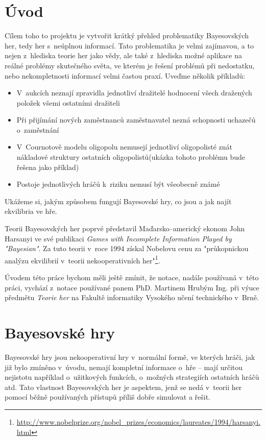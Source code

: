 \documentclass[12pt,a4paper,titlepage,final]{article}
\begin{document}
\section {Úvod} \label{uvod}
Cílem toho to projektu je vytvořit krátký přehled problematiky Bayesovských her, tedy her s~neúplnou informací.
Tato problematika je velmi zajímavou, a to nejen z~hlediska teorie her jako vědy, ale také z~hlediska možné aplikace na reálné problémy skutečného světa, ve kterém je řešení problémů při nedostatku, nebo nekompletnosti informací velmi častou praxí.
Uveďme několik příkladů:
\begin{itemize}
 \item V~aukcích neznají zpravidla jednotliví dražitelé hodnocení všech dražených položek všemi ostatními dražiteli
 \item Při přijímání nových zaměstnanců zaměstnavatel nezná schopnosti uchazečů o~zaměstnání
 \item V~Cournotově modelu oligopolu nemusejí jednotliví oligopolisté znát nákladové struktury ostatních oligopolistů(ukázka tohoto problému bude řešena jako příklad)
 \item Postoje jednotlivých hráčů k~riziku nemusí být všeobecně známé
\end{itemize}
Ukážeme si, jakým způsobem fungují Bayesovské hry, co jsou a jak najít ekvilibria ve hře.

Teorii Bayesovských her poprvé představil Maďarsko--americký ekonom John Harsanyi ve své publikaci \textit{Games with Incomplete Information Played by "Bayesian"}\cite{Harsanyi2004}.
Za tuto teorii v~roce 1994 získal Nobelovu cenu za "průkopnickou analýzu ekvilibrií v~teorii nekooperativních her"\footnote{\url{http://www.nobelprize.org/nobel_prizes/economics/laureates/1994/harsanyi.html}}.

Úvodem této práce bychom měli ještě zmínit, že notace, nadále používaná v~této práci, vychází z~notace používané panem PhD. Martinem Hrubým Ing. při výuce předmětu \textit{Teorie her} na Fakultě informatiky Vysokého učení technického v~Brně.

\section{Bayesovské hry}

Bayesovské hry jsou nekooperativní hry v~normální formě, ve kterých hráči, jak již bylo zmíněno v~úvodu, nemají kompletní informace o~hře -- mají určitou nejistotu například o~užitkových funkcích, o~možných strategiích ostatních hráčů atd.
Tato vlastnost Bayesovských her je aspektem, jenž se nedá v~teorii her pomocí běžně používaných přístupů příliš dobře simulovat a řešit.
\end{document}
